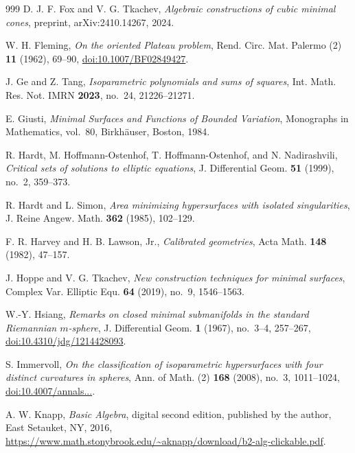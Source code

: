 \begin{thebibliography}{999}
D. J. F. Fox and V. G. Tkachev,
\emph{Algebraic constructions of cubic minimal cones},
preprint, arXiv:2410.14267, 2024.

W. H. Fleming,
\emph{On the oriented Plateau problem},
Rend. Circ. Mat. Palermo (2) \textbf{11} (1962), 69--90,
\href{https://doi.org/10.1007/BF02849427}{doi:10.1007/BF02849427}.

J. Ge and Z. Tang,
\emph{Isoparametric polynomials and sums of squares},
Int. Math. Res. Not. IMRN \textbf{2023}, no.~24, 21226--21271.

E. Giusti,
\emph{Minimal Surfaces and Functions of Bounded Variation},
Monographs in Mathematics, vol.~80, Birkh\"auser, Boston, 1984.

R. Hardt, M. Hoffmann-Ostenhof, T. Hoffmann-Ostenhof, and N. Nadirashvili,
\emph{Critical sets of solutions to elliptic equations},
J. Differential Geom. \textbf{51} (1999), no.~2, 359--373.

R. Hardt and L. Simon,
\emph{Area minimizing hypersurfaces with isolated singularities},
J. Reine Angew. Math. \textbf{362} (1985), 102--129.

F. R. Harvey and H. B. Lawson, Jr.,
\emph{Calibrated geometries},
Acta Math. \textbf{148} (1982), 47--157.

J. Hoppe and V. G. Tkachev,
\emph{New construction techniques for minimal surfaces},
Complex Var. Elliptic Equ. \textbf{64} (2019), no.~9, 1546--1563.

W.-Y. Hsiang,
\emph{Remarks on closed minimal submanifolds in the standard
Riemannian \(m\)-sphere},
J. Differential Geom. \textbf{1} (1967), no.~3--4, 257--267,
\href{https://doi.org/10.4310/jdg/1214428093}{doi:10.4310/jdg/1214428093}.

S. Immervoll,
\emph{On the classification of isoparametric hypersurfaces with four
distinct curvatures in spheres},
Ann. of Math. (2) \textbf{168} (2008), no.~3, 1011--1024,
\href{https://doi.org/10.4007/annals.2008.168.1011}{doi:10.4007/\allowbreak annals...}.

A. W. Knapp,
\emph{Basic Algebra}, digital second edition,
published by the author, East Setauket, NY, 2016,
\url{https://www.math.stonybrook.edu/~aknapp/download/b2-alg-clickable.pdf}.


\end{thebibliography}
